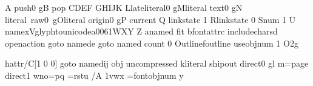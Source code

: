 \documentclass{article}
\begin{document}
A push{0 g}B pop C\pdfsave DE\pdfrestore F
G\immediate\pdfobj{}HIJK
L\pdfextension lateliteral{0 g}M\pdfextension literal text{0 g}N
\hbox{\pdfextension literal raw{0 g}}O\pdfextension literal origin{0 g}P current Q
\pdfextension linkstate 1 R\pdfextension linkstate 0 S\vbox{\pdfstartthread num 1 \pdfendthread}U
\hbox{\pdfthread name{x}}V\pdfextension glyphtounicode{a}{0061}WXY
Z\pdfrefobj\pdflastobj{} a\pdfdest name{d} fit b\pdfextension fontattrc
\pdfextension includecharsd openaction goto name{d}e
\pdfoutline goto name{d} count 0 {Outline}f\pdfextension outline useobjnum 1 {O2}g
\immediate{}h\pdfstartlink attr{/C[1 0 0]} goto name{d}i\pdfendlink j
\pdfextension obj uncompressed {}k\pdfextension literal shipout direct{0 g}l
m=\pdfcolorstackinit page direct{1 w}\relax n\edef\x{\pdffontname\font}o=\pdffontobjnum\font\relax p\edef\x{\pdfpageref 1}q
=\font r\pdfincludechars{}s\pdffontattr{}t\pdfincludechars{}u%
\pdffontattr {} {/A 1}v\edef\x{\pdffeedback fontname \font}w\edef\x{\pdffeedback fontsize \textfont 1}x%
=\pdffeedback fontobjnum \font\relax y
\end{document}
